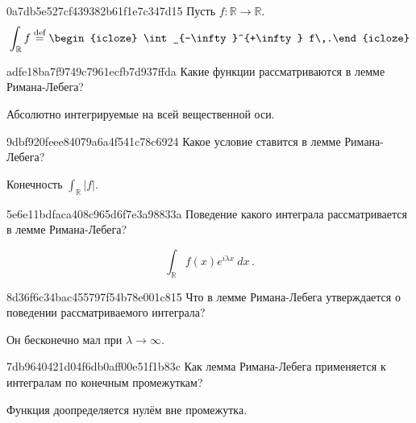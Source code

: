 \begin{note}{0a7db5e527cf439382b61f1e7c347d15}
    Пусть \({ f : \mathbb R \to \mathbb R }\).
    \[
        \int_{\mathbb R} f \overset{\text{def}}= \begin{icloze}{1}\int_{-\infty}^{+\infty} f\,.\end{icloze}
    \]
\end{note}

\begin{note}{adfe18ba7f9749c7961ecfb7d937ffda}
    Какие функции рассматриваются в лемме Римана-Лебега?

    \begin{cloze}{1}
        Абсолютно интегрируемые на всей вещественной оси.
    \end{cloze}
\end{note}

\begin{note}{9dbf920feee84079a6a4f541c78c6924}
    Какое условие ставится в лемме Римана-Лебега?

    \begin{cloze}{1}
        Конечность \({ \int_{\mathbb R} \left\lvert f \right\rvert }\).
    \end{cloze}
\end{note}

\begin{note}{5e6e11bdfaca408c965d6f7e3a98833a}
    Поведение какого интеграла рассматривается в лемме Римана-Лебега?

    \begin{cloze}{1}
        \[
            \int_{\mathbb R} f(x) e^{i \lambda x}\: dx\,.
        \]
    \end{cloze}
\end{note}

\begin{note}{8d36f6c34bac455797f54b78e001c815}
    Что в лемме Римана-Лебега утверждается о поведении рассматриваемого интеграла?

    \begin{cloze}{1}
        Он бесконечно мал при \({ \lambda \to \infty }\).
    \end{cloze}
\end{note}

\begin{note}{7db9640421d04f6db0aff00e51f1b83c}
    Как лемма Римана-Лебега применяется к интегралам по конечным промежуткам?

    \begin{cloze}{1}
        Функция доопределяется нулём вне промежутка.
    \end{cloze}
\end{note}

